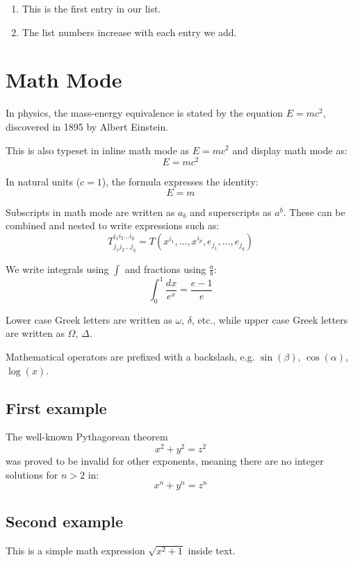 \documentclass[12pt, letterpaper]{article}
\begin{document}
\begin{enumerate}
    \item This is the first entry in our list.
    \item The list numbers increase with each entry we add.
\end{enumerate}

\vspace{20pt}

\section{Math Mode}

In physics, the mass-energy equivalence is stated by the equation $E=mc^2$, discovered in 1895 by Albert Einstein.

This is also typeset in inline math mode as $E=mc^2$ and display math mode as:
\[
E = mc^2
\]

In natural units ($c = 1$), the formula expresses the identity:
\begin{equation}
E = m
\end{equation}

Subscripts in math mode are written as $a_b$ and superscripts as $a^b$. These can be combined and nested to write expressions such as:
\[
T^{i_1 i_2 \dots i_p}_{j_1 j_2 \dots j_q} = T(x^{i_1}, \dots, x^{i_p}, e_{j_1}, \dots, e_{j_q})
\]

We write integrals using $\int$ and fractions using $\frac{a}{b}$:
\[
\int_0^1 \frac{dx}{e^x} = \frac{e-1}{e}
\]

Lower case Greek letters are written as $\omega$, $\delta$, etc., while upper case Greek letters are written as $\Omega$, $\Delta$.

Mathematical operators are prefixed with a backslash, e.g. $\sin(\beta)$, $\cos(\alpha)$, $\log(x)$.

\subsection{First example}

The well-known Pythagorean theorem
\[x^2 + y^2 = z^2\]
was proved to be invalid for other exponents, meaning there are no integer solutions for $n > 2$ in:
\[x^n + y^n = z^n\]

\subsection{Second example}

This is a simple math expression $\sqrt{x^2+1}$ inside text.
\end{document}
